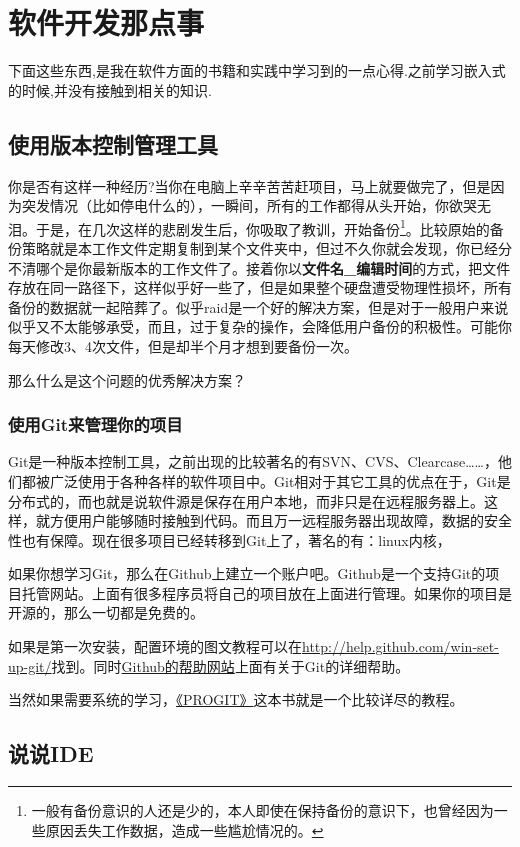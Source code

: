 \documentclass[a4paper]{book}
\newcommand{\chap}[1]{\newpage\thispagestyle{empty}\chapter{#1}\label{chap:\thechapter}}
\begin{document}
\chap{软件开发那点事}

下面这些东西,是我在软件方面的书籍和实践中学习到的一点心得.之前学习嵌入式的时候,并没有接触到相关的知识.

\section{使用版本控制管理工具}

你是否有这样一种经历?当你在电脑上辛辛苦苦赶项目，马上就要做完了，但是因为突发情况（比如停电什么的），一瞬间，所有的工作都得从头开始，你欲哭无泪。于是，在几次这样的悲剧发生后，你吸取了教训，开始备份\footnote{一般有备份意识的人还是少的，本人即使在保持备份的意识下，也曾经因为一些原因丢失工作数据，造成一些尴尬情况的。}。比较原始的备份策略就是本工作文件定期复制到某个文件夹中，但过不久你就会发现，你已经分不清哪个是你最新版本的工作文件了。接着你以\textbf{文件名\_编辑时间}的方式，把文件存放在同一路径下，这样似乎好一些了，但是如果整个硬盘遭受物理性损坏，所有备份的数据就一起陪葬了。似乎raid是一个好的解决方案，但是对于一般用户来说似乎又不太能够承受，而且，过于复杂的操作，会降低用户备份的积极性。可能你每天修改3、4次文件，但是却半个月才想到要备份一次。

那么什么是这个问题的优秀解决方案？

\subsection{使用Git来管理你的项目}

Git是一种版本控制工具，之前出现的比较著名的有SVN、CVS、Clearcase\ldots{}\ldots{}，他们都被广泛使用于各种各样的软件项目中。Git相对于其它工具的优点在于，Git是分布式的，而也就是说软件源是保存在用户本地，而非只是在远程服务器上。这样，就方便用户能够随时接触到代码。而且万一远程服务器出现故障，数据的安全性也有保障。现在很多项目已经转移到Git上了，著名的有：linux内核，

如果你想学习Git，那么在Github上建立一个账户吧。Github是一个支持Git的项目托管网站。上面有很多程序员将自己的项目放在上面进行管理。如果你的项目是开源的，那么一切都是免费的。

如果是第一次安装，配置环境的图文教程可以在\url{http://help.github.com/win-set-up-git/}找到。同时\href{http://help.github.com/}{Github的帮助网站}上面有关于Git的详细帮助。

当然如果需要系统的学习，\href{http://progit.org/}{《PROGIT》}这本书就是一个比较详尽的教程。

\section{说说IDE}
\end{document}
